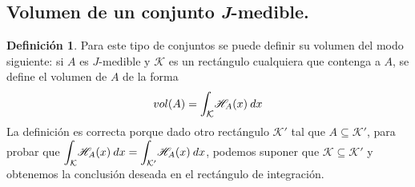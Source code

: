 \documentclass[12pt,twoside]{report}
\newcommand\mc[1]{\mathcal{#1}}
\theoremstyle{azul}
\theoremstyle{azul2}
\theoremstyle{plain}
\theoremstyle{definition}
\newtheorem{defin}{Definición}[chapter]
\theoremstyle{remark}
\begin{document}
\subsection{Volumen de un conjunto \textit{J}-medible.}
\begin{defin} \label{defvol}
Para este tipo de conjuntos se puede definir su volumen del modo siguiente: si $A$ es $J$-medible y $\mc{K}$ es un rectángulo cualquiera que contenga a $A$, se define el volumen de $A$ de la forma
$$vol(A)=\mathlarger{\int_{\mc{K}}}\mathscr{H}_A(x) \: dx$$
La definición es correcta porque dado otro rectángulo $\mc{K}'$ tal que $A \subseteq \mc{K}'$, para probar que $\mathlarger{\int_{\mc{K}}}\mathscr{H}_A(x) \: dx=\mathlarger{\int_{\mc{K}'}}\mathscr{H}_A(x) \: dx$, podemos suponer que $\mc{K} \subseteq \mc{K}'$ y obtenemos la conclusión deseada en el rectángulo de integración.
\end{defin}
\end{document}
